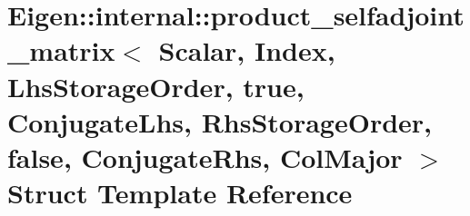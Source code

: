\hypertarget{struct_eigen_1_1internal_1_1product__selfadjoint__matrix_3_01_scalar_00_01_index_00_01_lhs_storaad3bcb15c8c51e53cb4ff654ee80e230}{}\section{Eigen\+:\+:internal\+:\+:product\+\_\+selfadjoint\+\_\+matrix$<$ Scalar, Index, Lhs\+Storage\+Order, true, Conjugate\+Lhs, Rhs\+Storage\+Order, false, Conjugate\+Rhs, Col\+Major $>$ Struct Template Reference}
\label{struct_eigen_1_1internal_1_1product__selfadjoint__matrix_3_01_scalar_00_01_index_00_01_lhs_storaad3bcb15c8c51e53cb4ff654ee80e230}
